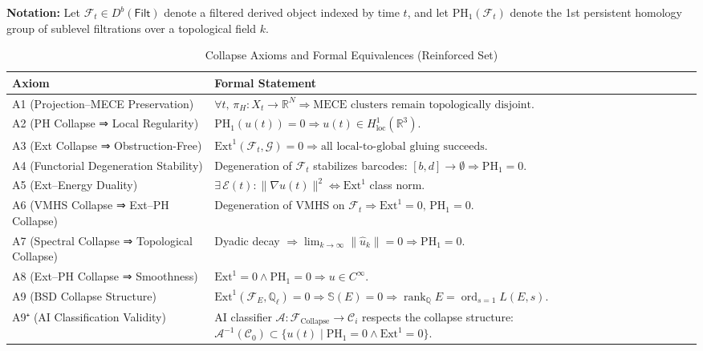 \documentclass[11pt]{article}
\newcommand{\Sha}{\mathbb{S}}
\begin{document}
\begin{axiom}
\begin{axiom}
{{\textbf{Notation:} Let \( \mathcal{F}_t \in D^b(\mathsf{Filt}) \) denote a filtered derived object indexed by time \( t \),  
and let \( \mathrm{PH}_1(\mathcal{F}_t) \) denote the 1st persistent homology group of sublevel filtrations over a topological field \( k \).  

\begin{table}[H]
\centering
\renewcommand{\arraystretch}{1.4}
\begin{tabularx}{\textwidth}{lX}
\toprule
\textbf{Axiom} & \textbf{Formal Statement} \\
\midrule
A1 (Projection–MECE Preservation) & 
\( \forall t,\, \pi_H: X_t \to \mathbb{R}^N \Rightarrow \text{MECE clusters remain topologically disjoint}. \) \\
A2 (PH Collapse ⇒ Local Regularity) & 
\( \mathrm{PH}_1(u(t)) = 0 \Rightarrow u(t) \in H^1_{\text{loc}}(\mathbb{R}^3). \) \\
A3 (Ext Collapse ⇒ Obstruction-Free) & 
\( \mathrm{Ext}^1(\mathcal{F}_t, \mathcal{G}) = 0 \Rightarrow \text{all local-to-global gluing succeeds}. \) \\
A4 (Functorial Degeneration Stability) & 
Degeneration of \( \mathcal{F}_t \) stabilizes barcodes: \( [b,d] \to \emptyset \Rightarrow \mathrm{PH}_1 = 0. \) \\
A5 (Ext–Energy Duality) & 
\( \exists\, \mathcal{E}(t): \|\nabla u(t)\|^2 \Leftrightarrow \mathrm{Ext}^1 \) class norm. \\
A6 (VMHS Collapse ⇒ Ext–PH Collapse) & 
Degeneration of VMHS on \( \mathcal{F}_t \Rightarrow \mathrm{Ext}^1 = 0,\, \mathrm{PH}_1 = 0. \) \\
A7 (Spectral Collapse ⇒ Topological Collapse) & 
Dyadic decay \( \Rightarrow \lim_{k \to \infty} \|\hat{u}_k\| = 0 \Rightarrow \mathrm{PH}_1 = 0. \) \\
A8 (Ext–PH Collapse ⇒ Smoothness) & 
\( \mathrm{Ext}^1 = 0 \land \mathrm{PH}_1 = 0 \Rightarrow u \in C^\infty. \) \\
A9 (BSD Collapse Structure) & 
\( \mathrm{Ext}^1(\mathcal{F}_E, \mathbb{Q}_\ell) = 0 \Rightarrow \Sha(E) = 0 \Rightarrow 
\operatorname{rank}_{\mathbb{Q}} E = \operatorname{ord}_{s=1} L(E, s). \) \\
A9⁺ (AI Classification Validity) & 
AI classifier \( \mathcal{A}: \mathcal{F}_{\text{Collapse}} \to \mathcal{C}_i \) respects the collapse structure:  
\( \mathcal{A}^{-1}(\mathcal{C}_0) \subset \{ u(t) \mid \mathrm{PH}_1 = 0 \land \mathrm{Ext}^1 = 0 \} \). \\
\bottomrule
\end{tabularx}
\caption{Collapse Axioms and Formal Equivalences (Reinforced Set)}
\end{table}

}}
\end{axiom}
\end{axiom}
\end{document}
